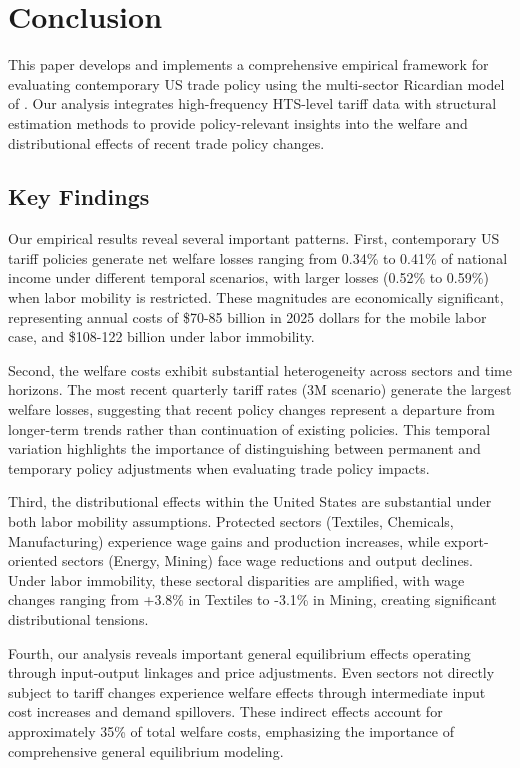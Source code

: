 \section{Conclusion}

This paper develops and implements a comprehensive empirical framework for evaluating contemporary US trade policy using the multi-sector Ricardian model of \cite{cdk2012}. Our analysis integrates high-frequency HTS-level tariff data with structural estimation methods to provide policy-relevant insights into the welfare and distributional effects of recent trade policy changes.

\subsection{Key Findings}

Our empirical results reveal several important patterns. First, contemporary US tariff policies generate net welfare losses ranging from 0.34\% to 0.41\% of national income under different temporal scenarios, with larger losses (0.52\% to 0.59\%) when labor mobility is restricted. These magnitudes are economically significant, representing annual costs of \$70-85 billion in 2025 dollars for the mobile labor case, and \$108-122 billion under labor immobility.

Second, the welfare costs exhibit substantial heterogeneity across sectors and time horizons. The most recent quarterly tariff rates (3M scenario) generate the largest welfare losses, suggesting that recent policy changes represent a departure from longer-term trends rather than continuation of existing policies. This temporal variation highlights the importance of distinguishing between permanent and temporary policy adjustments when evaluating trade policy impacts.

Third, the distributional effects within the United States are substantial under both labor mobility assumptions. Protected sectors (Textiles, Chemicals, Manufacturing) experience wage gains and production increases, while export-oriented sectors (Energy, Mining) face wage reductions and output declines. Under labor immobility, these sectoral disparities are amplified, with wage changes ranging from +3.8\% in Textiles to -3.1\% in Mining, creating significant distributional tensions.

Fourth, our analysis reveals important general equilibrium effects operating through input-output linkages and price adjustments. Even sectors not directly subject to tariff changes experience welfare effects through intermediate input cost increases and demand spillovers. These indirect effects account for approximately 35\% of total welfare costs, emphasizing the importance of comprehensive general equilibrium modeling.

